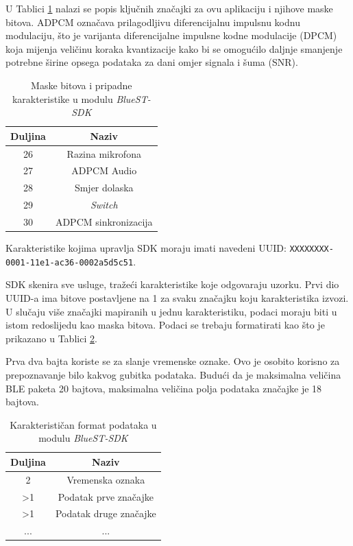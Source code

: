U Tablici \ref{table:masks} nalazi se popis ključnih značajki za ovu aplikaciju i njihove maske bitova. ADPCM označava prilagodljivu diferencijalnu impulsnu kodnu modulaciju, što je varijanta diferencijalne impulsne kodne modulacije (DPCM) koja mijenja veličinu koraka kvantizacije kako bi se omogućilo daljnje smanjenje potrebne širine opsega podataka za dani omjer signala i šuma (SNR). 

\begin{table}[ht!]
	\centering
	\caption{Maske bitova i pripadne karakteristike u modulu \textit{BlueST-SDK} \cite{bluest}}
	\begin{tabular}{|c| c|}
		\hline
		\rowcolor{lightblue}  
		\textbf{Duljina} & \textbf{Naziv}  \\ \hline
		26 & Razina mikrofona \\ \hline
		27 & ADPCM Audio \\ \hline
		28 & Smjer dolaska \\ \hline
		29 & \textit{Switch} \\ \hline
		30 & ADPCM sinkronizacija  \\ \hline
	\end{tabular}
	\label{table:masks}
\end{table}

Karakteristike kojima upravlja SDK moraju imati navedeni UUID:
\newline \texttt{XXXXXXXX-0001-11e1-ac36-0002a5d5c51}. 

SDK skenira sve usluge, tražeći karakteristike koje odgovaraju uzorku. Prvi dio UUID-a ima bitove postavljene na 1 za svaku značajku koju karakteristika izvozi. U slučaju više značajki mapiranih u jednu karakteristiku, podaci moraju biti u istom redoslijedu kao maska bitova. Podaci se trebaju formatirati kao što je prikazano u Tablici \ref{table:data_format}.

Prva dva bajta koriste se za slanje vremenske oznake. Ovo je osobito korisno za prepoznavanje bilo kakvog gubitka podataka. Budući da je maksimalna veličina BLE paketa 20 bajtova, maksimalna veličina polja podataka značajke je 18 bajtova.

\begin{table}[ht!]
	\centering
	\caption{Karakterističan format podataka u modulu \textit{BlueST-SDK} \cite{bluest}}
	\begin{tabular}{|c| c|}
		\hline
		\rowcolor{lightblue}  
		\textbf{Duljina} & \textbf{Naziv}  \\ \hline
		2 &  Vremenska oznaka \\ \hline
		>1 & Podatak prve značajke \\ \hline
		>1 & Podatak druge značajke \\ \hline
		... & ... \\ \hline
	\end{tabular}
	\label{table:data_format}
\end{table}

